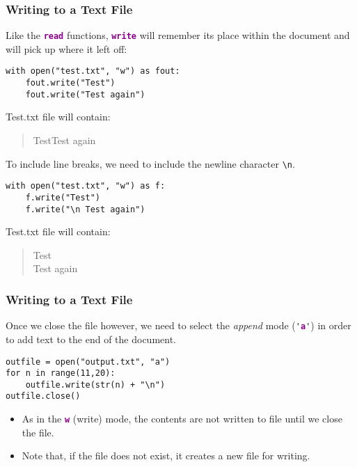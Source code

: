 \documentclass[xcolor=svgnames]{beamer}
\newcommand{\command}[1]{\texttt{\textbf{\textcolor{DarkMagenta}{#1}}}}
\newcommand{\ft}[1]{\frametitle{#1}}
\begin{document}
\begin{frame}[fragile]\ft{Writing to a Text File}
Like the \command{read} functions, \command{write} will remember its place within the document and will pick up where it left off:
\vfill
\begin{Verbatim}[xleftmargin=.5in, frame=single]
with open("test.txt", "w") as fout:
    fout.write("Test")
    fout.write("Test again")
\end{Verbatim}
Test.txt file will contain:
\begin{quote}
TestTest again
\end{quote}
To include line breaks, we need to include the newline character \verb|\n|.
\begin{Verbatim}[xleftmargin=.5in, frame=single]
with open("test.txt", "w") as f:
    f.write("Test")
    f.write("\n Test again")
\end{Verbatim}
Test.txt file will contain:
\begin{quote}
Test\\
Test again
\end{quote}
\end{frame}



\begin{frame}[fragile]\ft{Writing to a Text File}
Once we close the file however, we need to select the \emph{append} mode (\verb|'|\command{a}\verb|'|)  in order to add text to the end of the document. 
\begin{Verbatim}[xleftmargin=.5in, frame=single]
outfile = open("output.txt", "a")
for n in range(11,20):
    outfile.write(str(n) + "\n")
outfile.close() 
\end{Verbatim}
\begin{itemize}
\item As in the \command{w} (write) mode, the contents are not written to file until we close the file.
\item  Note that, if the file does not exist, it creates a new file for writing. 
\end{itemize}
\end{frame}





\end{document}

